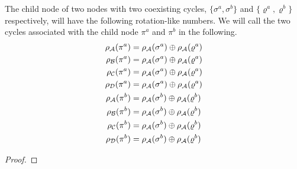 \begin{theorem}
    The child node of two nodes with two coexisting cycles, $\{\sigma^a, \sigma^b\}$ and $\{\varrho^a, \varrho^b\}$ respectively, will have the following rotation-like numbers.
    We will call the two cycles associated with the child node $\pi^a$ and $\pi^b$ in the following.
    \begin{align*}
        \rho_{\mathcal{A}}(\pi^a) & = \rho_{\mathcal{A}}(\sigma^a) \oplus \rho_{\mathcal{A}}(\varrho^a) \\
        \rho_{\mathcal{B}}(\pi^a) & = \rho_{\mathcal{A}}(\sigma^a) \oplus \rho_{\mathcal{A}}(\varrho^a) \\
        \rho_{\mathcal{C}}(\pi^a) & = \rho_{\mathcal{A}}(\sigma^a) \oplus \rho_{\mathcal{A}}(\varrho^a) \\
        \rho_{\mathcal{D}}(\pi^a) & = \rho_{\mathcal{A}}(\sigma^a) \oplus \rho_{\mathcal{A}}(\varrho^a) \\
        \rho_{\mathcal{A}}(\pi^b) & = \rho_{\mathcal{A}}(\sigma^b) \oplus \rho_{\mathcal{A}}(\varrho^b) \\
        \rho_{\mathcal{B}}(\pi^b) & = \rho_{\mathcal{A}}(\sigma^b) \oplus \rho_{\mathcal{A}}(\varrho^b) \\
        \rho_{\mathcal{C}}(\pi^b) & = \rho_{\mathcal{A}}(\sigma^b) \oplus \rho_{\mathcal{A}}(\varrho^b) \\
        \rho_{\mathcal{D}}(\pi^b) & = \rho_{\mathcal{A}}(\sigma^b) \oplus \rho_{\mathcal{A}}(\varrho^b)
    \end{align*}
\end{theorem}

\begin{proof}
\end{proof}